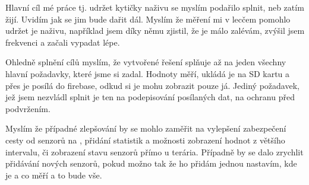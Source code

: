 Hlavní cíl mé práce tj. udržet kytičky naživu se myslím podařilo splnit, neb zatím žijí. Uvidím jak se jim bude dařit 
dál. Myslím že měření mi v lecčem pomohlo udržet je naživu, například jsem díky němu zjistil, že je málo zalévám, zvýšil 
jsem frekvenci a začali vypadat lépe.

Ohledně splnění cílů myslím, že vytvořené řešení splňuje až na jeden všechny hlavní požadavky, které jsme si zadal. 
Hodnoty měří, ukládá je na SD kartu a přes  je posílá do \gls{firebase}, odkud si je mohu zobrazit 
pouze já. Jediný požadavek, jež jsem nezvládl splnit je ten na podepisování posílaných dat, na ochranu před podvržením.

Myslím že případné zlepšování by se mohlo zaměřit na vylepšení zabezpečení cesty od senzorů na , 
přidání statistik a možnosti zobrazení hodnot z většího intervalu, či zobrazení stavu senzorů přímo u terária. Případně 
by se dalo zrychlit přidávání nových senzorů, pokud možno tak že ho přidám jednou nastavím, kde je a co měří a to bude 
vše.

